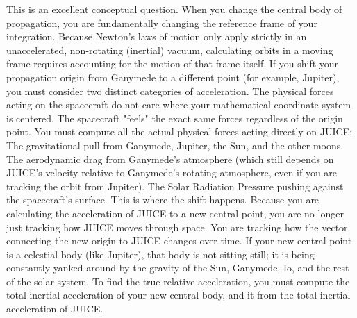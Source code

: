 {}
\markdownRendererSectionEnd \markdownRendererSectionBegin
{}\markdownRendererInterblockSeparator
{}This is an excellent conceptual question. When you change the central body of propagation, you are fundamentally changing the reference frame of your integration.\markdownRendererInterblockSeparator
{}Because Newton's laws of motion only apply strictly in an unaccelerated, non-rotating (inertial) vacuum, calculating orbits in a moving frame requires accounting for the motion of that frame itself.\markdownRendererInterblockSeparator
{}If you shift your propagation origin from Ganymede to a different point (for example, Jupiter), you must consider two distinct categories of acceleration.\markdownRendererInterblockSeparator
{}\markdownRendererSectionBegin
{}\markdownRendererInterblockSeparator
{}The physical forces acting on the spacecraft do not care where your mathematical coordinate system is centered. The spacecraft "feels" the exact same forces regardless of the origin point.\markdownRendererInterblockSeparator
{}You must compute all the actual physical forces acting directly on JUICE:\markdownRendererInterblockSeparator
{}\markdownRendererUlBegin
\markdownRendererUlItem The gravitational pull from Ganymede, Jupiter, the Sun, and the other moons.\markdownRendererUlItemEnd 
\markdownRendererUlItem The aerodynamic drag from Ganymede's atmosphere (which still depends on JUICE's velocity relative to Ganymede's rotating atmosphere, even if you are tracking the orbit from Jupiter).\markdownRendererUlItemEnd 
\markdownRendererUlItem The Solar Radiation Pressure pushing against the spacecraft's surface.\markdownRendererUlItemEnd 
\markdownRendererUlEnd \markdownRendererInterblockSeparator
{}
\markdownRendererSectionEnd \markdownRendererSectionBegin
{}\markdownRendererInterblockSeparator
{}This is where the shift happens. Because you are calculating the acceleration of JUICE  to a new central point, you are no longer just tracking how JUICE moves through space. You are tracking how the vector connecting the new origin to JUICE changes over time.\markdownRendererInterblockSeparator
{}If your new central point is a celestial body (like Jupiter), that body is not sitting still; it is being constantly yanked around by the gravity of the Sun, Ganymede, Io, and the rest of the solar system.\markdownRendererInterblockSeparator
{}To find the true relative acceleration, you must compute the total inertial acceleration of your new central body, and  it from the total inertial acceleration of JUICE.\markdownRendererInterblockSeparator

